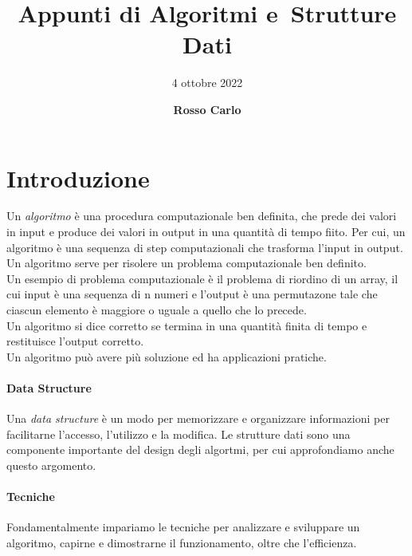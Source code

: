 \documentclass{article}
\title{\vspace{2cm}\textbf{Appunti di Algoritmi e\ Strutture Dati}}
\author{\vspace{3mm}4 ottobre 2022}
\date{\vspace{3mm} \textbf{Rosso Carlo}}
\begin{document}
\begin{titlepage}
	\maketitle
	\thispagestyle{empty}
\end{titlepage}
\tableofcontents
\newpage

\section{Introduzione}
Un \textit{algoritmo} è una procedura computazionale ben definita, che prede dei valori
in input e produce dei valori in output in una quantità di tempo fiito. Per cui,
un algoritmo è una sequenza di step computazionali che trasforma l'input in
output.\\
Un algoritmo serve per risolere un problema computazionale ben definito.\\
Un esempio di problema computazionale è il problema di riordino di un array, il
cui input è una sequenza di n numeri e l'output è una permutazone tale che
ciascun elemento è maggiore o uguale a quello che lo precede.\\
Un algoritmo si dice corretto se termina in una quantità finita di tempo e
restituisce l'output corretto.\\
Un algoritmo può avere più soluzione ed ha applicazioni pratiche.\\
\paragraph{Data Structure} Una \textit{data structure} è un modo per memorizzare e
organizzare informazioni per facilitarne l'accesso, l'utilizzo e la modifica.
Le strutture dati sono una componente importante del design degli algortmi, per
cui approfondiamo anche questo argomento.
\paragraph{Tecniche} Fondamentalmente impariamo le tecniche per analizzare e
sviluppare un algoritmo, capirne e dimostrarne il funzionamento, oltre che
l'efficienza.
\end{document}
